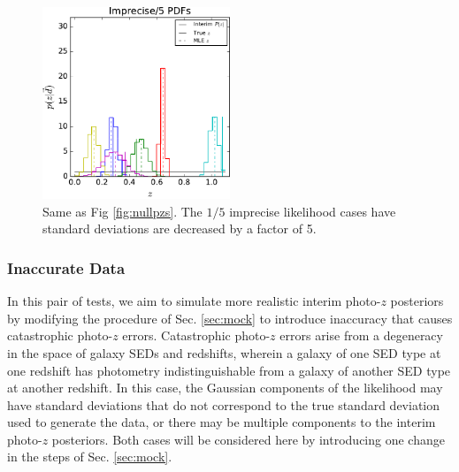 \documentclass[preprint]{aastex}
\begin{document}
\begin{figure}
\includegraphics[width=0.5\textwidth]{figs/sig1/samplepzs.pdf}
\caption{Same as Fig \ref{fig:nullpzs}.  The $1/5$ imprecise likelihood cases 
have standard deviations are decreased by a factor of 5.}
\label{fig:sigspzs}
\end{figure}

\subsubsection{Inaccurate Data}
\label{sec:inaccuracy}

In this pair of tests, we aim to simulate more realistic interim photo-$z$ 
posteriors by modifying the procedure of Sec. \ref{sec:mock} to introduce 
inaccuracy that causes catastrophic photo-$z$ errors.  Catastrophic photo-$z$ 
errors arise from a degeneracy in the space of galaxy SEDs and redshifts, 
wherein a galaxy of one SED type at one redshift has photometry 
indistinguishable from a galaxy of another SED type at another redshift.  In 
this case, the Gaussian components of the likelihood may have standard 
deviations that do not correspond to the true standard deviation used to 
generate the data, or there may be multiple components to the interim photo-$z$ 
posteriors.  Both cases will be considered here by introducing one change in 
the steps of Sec. \ref{sec:mock}.  
\end{document}
